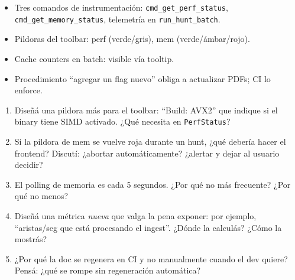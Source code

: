 \begin{itemize}
    \item Tres comandos de instrumentación:
    \texttt{cmd\_get\_perf\_status},
    \texttt{cmd\_get\_memory\_status}, telemetría en
    \texttt{run\_hunt\_batch}.
    \item Pildoras del toolbar: perf (verde/gris), mem
    (verde/ámbar/rojo).
    \item Cache counters en batch: visible vía tooltip.
    \item Procedimiento ``agregar un flag nuevo'' obliga a
    actualizar PDFs; CI lo enforce.
\end{itemize}

\begin{ejercicios}
\begin{enumerate}
    \item \starred{} Diseñá una pildora más para el toolbar:
    ``Build: AVX2'' que indique si el binary tiene SIMD activado.
    ¿Qué necesita en \texttt{PerfStatus}?

    \item Si la pildora de mem se vuelve roja durante un hunt,
    ¿qué debería hacer el frontend? Discutí: ¿abortar
    automáticamente? ¿alertar y dejar al usuario decidir?

    \item \starred{} El polling de memoria es cada 5 segundos.
    ¿Por qué no más frecuente? ¿Por qué no menos?

    \item Diseñá una métrica \emph{nueva} que valga la pena
    exponer: por ejemplo, ``aristas/seg que está procesando el
    ingest''. ¿Dónde la calculás? ¿Cómo la mostrás?

    \item ¿Por qué la doc se regenera en CI y no manualmente
    cuando el dev quiere? Pensá: ¿qué se rompe sin regeneración
    automática?
\end{enumerate}
\end{ejercicios}
